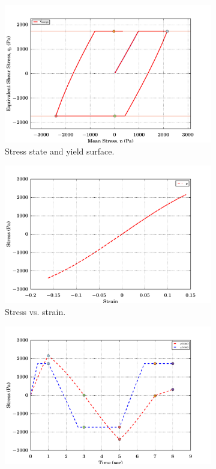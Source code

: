 \begin{figure}[htbp!]
  \begin{subfigure}{0.5\textwidth}
    \centering
    \includegraphics[width=\textwidth]{MPMMaterials/FIGS/UniaxialStrainLoadUnloadJ2NonLin_yield_surface.pdf}
    \caption{Stress state and yield surface.}
  \end{subfigure}
  \begin{subfigure}{0.5\textwidth}
    \centering
    \includegraphics[width=\textwidth]{MPMMaterials/FIGS/UniaxialStrainLoadUnloadJ2NonLin_sigma_eps.pdf}
    \caption{Stress vs. strain.}
  \end{subfigure}
  \begin{subfigure}{0.5\textwidth}
    \centering
    \includegraphics[width=\textwidth]{MPMMaterials/FIGS/UniaxialStrainLoadUnloadJ2NonLin_pq_time.pdf}

\end{subfigure}
\end{figure}
